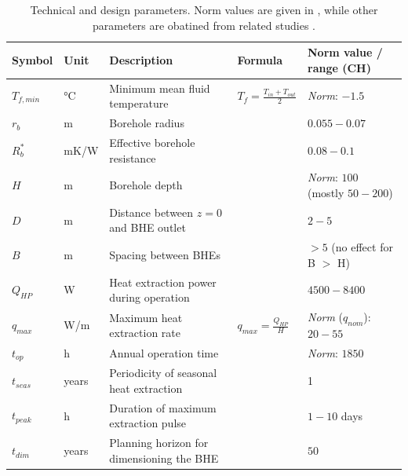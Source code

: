 \begin{table}[tb]
\footnotesize
\caption{Technical and design parameters. Norm values are given in \citep{sia_sondes_2010}, while other parameters are obatined from related studies \citep{pahud_geothermal_2002, wagner_erdwarmesonden._2019, claesson_conductive_1988}.}
\centering
\begin{tabular}{lllll}
\hline
\textbf{Symbol} & \textbf{Unit} & \textbf{Description}                   & \textbf{Formula}                                        & \textbf{Norm value / range (CH)} \\ \hline
$T_{f, min}$    & °C   & Minimum mean fluid temperature         & $T_{f} = \frac{T_{in} + T_{out}}{2}$                    & \textit{Norm}: $- 1.5$           \\
$r_b$           & m           & Borehole radius                        &                                                         & $0.055-0.07$                      \\
$R_b^*$         & mK/W        & Effective borehole resistance          &                                                         & $0.08-0.1$                       \\ \hline
$H$             & m           & Borehole depth                         &                                                         & \textit{Norm}: $100$ (mostly $50-200$)          \\
$D$             & m           & Distance between $z=0$ and BHE outlet  &                                                         & $2-5$                              \\
$B$             & m           & Spacing between BHEs                   &                                                         & $>5$ (no effect for B $>$ H)     \\ \hline
$Q_{HP}$        & W           & Heat extraction power during operation &                                                         & $4500-8400$                      \\
$q_\mathit{max}$       & W/m         & Maximum heat extraction rate           & $q_\mathit{max} = \frac{Q_{HP}}{H}$                            & \textit{Norm} ($q_{nom}$): $20-55$           \\
$t_{op}$        & h           & Annual operation time                  &                                                         & \textit{Norm}: $1850$  \\
$t_{seas}$      & years           & Periodicity of seasonal heat extraction  &                                                         & 1                 \\ 
$t_{peak}$      & h           & Duration of maximum extraction pulse   &                                                         & $1 - 10$ days                    \\ 
\hline
$t_\mathit{dim}$       & years           & Planning horizon for dimensioning the BHE   &                                                         & $50$                    \\ 
\hline
\end{tabular}
\label{tab:tech_design_params}
\end{table}

